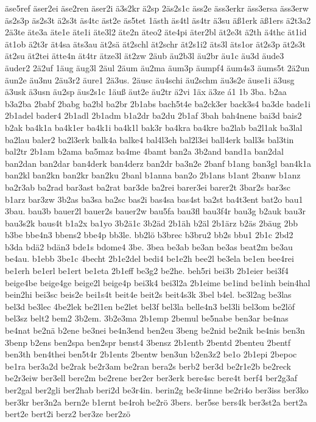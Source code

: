 {äse5ref
äser2ei
äse2ren
äser2i
ä3s2kr
ä2sp
2äs2s1c
äss2e
äss3erkr
äss3ersa
äss3erw
äs2s3p
äs2s3t
ä2s3t
äs4tc
äst2e
äs5tet
1ästh
äs4tl
äs4tr
ä3su
äß1erk
äß1ers
ä2t3a2
2ä3te
äte3a
äte1e
äte1i
äte3l2
äte2n
äteo2
äte4pi
äter2bl
ät2e3t
ä2th
ä4thc
ät1id
ät1ob
ä2t3r
ät4sa
äts3au
ät2sä
ät2schl
ät2schr
ät2s1i2
äts3l
äts1or
ät2s3p
ät2s3t
ät2su
ät2tei
ätte4n
ät4tr
ätze3l
ät2zw
2äub
äu2b3l
äu2br
äu1c
äu3d
äude3
äuder2
2ä2uf
1äug
äug3l
2äul
2äum
äu2ma
äum3p
äumpf4
äum4s3
äums5t
2ä2un
äun2e
äu3nu
2äu3r2
äure1
2ä3us.
2äusc
äu4schi
äu2schm
äu3s2e
äuse1i
ä3usg
ä3usk
ä3usn
äu2sp
äus2s1c
1äuß
äut2e
äu2tr
ä2vi
1äx
ä3ze
á1
1b
3ba.
b2aa
b3a2ba
2babf
2babg
ba2bl
ba2br
2b1abs
bach5t4e
ba2ck3er
back3s4
ba3de
bade1i
2b1adel
bader4
2b1adl
2b1adm
b1a2dr
ba2du
2b1af
3bah
bah4nene
bai3d
bais2
b2ak
ba4k1a
ba4k1er
ba4k1i
ba4k1l
bak3r
ba4kra
ba4kre
ba2lab
ba2l1ak
ba3lal
ba2lau
baler2
ba2l3erk
balk4a
balke4
bal4l3eh
bal2l3ei
ball4erk
ball3s
bal3tin
bal2tr
2b1am
b2ama
ba5maz
ba4me
4bamt
ban2a
3b2and
band1a
ban2dal
ban2dan
ban2dar
ban4derk
ban4derz
ban2dr
ba3n2e
2banf
b1ang
ban3gl
ban4k1a
ban2kl
ban2kn
ban2kr
ban2ku
2banl
b1anna
ban2o
2b1ans
b1ant
2banw
b1anz
ba2r3ab
ba2rad
bar3ast
ba2rat
bar3de
ba2rei
barer3ei
barer2t
3bar2s
bar3sc
b1arz
bar3zw
3b2as
ba3sa
ba2sc
bas2i
bas4sa
bas4st
ba2st
ba4t3ent
bat2o
bau1
3bau.
bau3b
bauer2l
bauer2s
bauer2w
bau5fa
bau3fl
bau3f4r
bau3g
b2auk
bau3r
bau3s2k
baus4t
b1a2x
ba1yo
3b2ä1c
3b2äd
2b1äh
b2äl
2b1ärz
b2äs
2bäug
2bb
b3be
bbe4n3
bbens2
bbe4p
bb3le.
bb2lö
b3brec
b3bru2
bb2s
bbu1
2b1c
2bd2
b3da
bdä2
bdän3
bde1s
bdome4
3be.
3bea
be3ab
be3an
be3as
beat2m
be3au
be4au.
b1ebb
3be1c
4becht
2b1e2del
bedi4
be1e2h
bee2l
be3ela
be1en
bee4rei
be1erh
be1erl
be1ert
be1eta
2b1eff
be3g2
be2he.
beh5ri
bei3b
2b1eier
bei3f4
beige4be
beige4ge
beige2l
beige4p
bei3k4
bei3l2a
2b1eime
be1ind
be1inh
bein4hal
bein2hi
bei3sc
beis2e
bei1s4t
beit4e
beit2s
beit4s3k
3bel
b4el.
be3l2ag
be3las
bel3d
be3lec
4be2lek
be2l1en
be2let
bel3f
bel3la
belle4n3
bel3li
bel3om
be2löf
bel3sz
belt2
bem2
3b2em.
3b2e3ma
2b1emp
2bemul
be5nabe
ben3ar
be4nas
be4nat
be2nä
b2ene
be3nei
be4n3end
ben2eu
3beng
be2nid
be2nik
be4nis
ben3n
3benp
b2ens
ben2spa
ben2spr
benst4
3bensz
2b1entb
2bentd
2benteu
2bentf
ben3th
ben4thei
ben5t4r
2b1ents
2bentw
ben3un
b2en3z2
be1o
2b1epi
2bepoc
be1ra
ber3a2d
be2rak
be2r3am
be2ran
bera2s
berb2
ber3d
be2r1e2b
be2reck
be2r3eiw
ber3ell
bere2m
be2rene
ber2er
ber3erk
bere4sc
bere4t
berf4
ber2g3af
ber2gal
ber2gli
ber2hab
beri2d
be3r4in.
berin2g
be3r4inne
be2ri4o
ber3iss
ber3ko
ber3kr
ber3n2a
bern2e
b1ernt
be4roh
be2rö
3bers.
ber5se
bers4k
ber3st2a
bert2a
bert2e
bert2i
berz2
ber3ze
ber2zö
}
